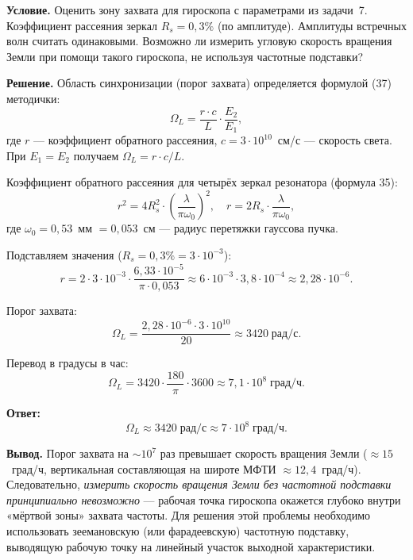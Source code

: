 \documentclass[12pt, a4paper]{article}
\begin{document}
\textbf{Условие.} Оценить зону захвата для гироскопа с параметрами из задачи~7. Коэффициент рассеяния зеркал $R_s = 0{,}3\%$ (по амплитуде). Амплитуды встречных волн считать одинаковыми. Возможно ли измерить угловую скорость вращения Земли при помощи такого гироскопа, не используя частотные подставки?

\textbf{Решение.} Область синхронизации (порог захвата) определяется формулой (37) методички:
\begin{equation}
    \Omega_L = \frac{r \cdot c}{L} \cdot \frac{E_2}{E_1},
\end{equation}
где $r$ --- коэффициент обратного рассеяния, $c = 3 \cdot 10^{10}$~см/с --- скорость света. При $E_1 = E_2$ получаем $\Omega_L = r \cdot c / L$.

Коэффициент обратного рассеяния для четырёх зеркал резонатора (формула 35):
\begin{equation}
    r^2 = 4 R_s^2 \cdot \left(\frac{\lambda}{\pi \omega_0}\right)^2, \quad r = 2 R_s \cdot \frac{\lambda}{\pi \omega_0},
\end{equation}
где $\omega_0 = 0{,}53$~мм $= 0{,}053$~см --- радиус перетяжки гауссова пучка.

Подставляем значения ($R_s = 0{,}3\% = 3 \cdot 10^{-3}$):
\begin{equation}
    r = 2 \cdot 3 \cdot 10^{-3} \cdot \frac{6{,}33 \cdot 10^{-5}}{\pi \cdot 0{,}053} \approx 6 \cdot 10^{-3} \cdot 3{,}8 \cdot 10^{-4} \approx 2{,}28 \cdot 10^{-6}.
\end{equation}

Порог захвата:
\begin{equation}
    \Omega_L = \frac{2{,}28 \cdot 10^{-6} \cdot 3 \cdot 10^{10}}{20} \approx 3420 \; \text{рад/с}.
\end{equation}

Перевод в градусы в час:
\begin{equation}
    \Omega_L = 3420 \cdot \frac{180}{\pi} \cdot 3600 \approx 7{,}1 \cdot 10^8 \; \text{град/ч}.
\end{equation}

\textbf{Ответ:}
\[
    \boxed{\Omega_L \approx 3420 \; \text{рад/с} \approx 7 \cdot 10^8 \; \text{град/ч}.}
\]

\textbf{Вывод.} Порог захвата на $\sim 10^7$ раз превышает скорость вращения Земли ($\approx 15$~град/ч, вертикальная составляющая на широте МФТИ $\approx 12{,}4$~град/ч). Следовательно, \textit{измерить скорость вращения Земли без частотной подставки принципиально невозможно} --- рабочая точка гироскопа окажется глубоко внутри «мёртвой зоны» захвата частоты. Для решения этой проблемы необходимо использовать зеемановскую (или фарадеевскую) частотную подставку, выводящую рабочую точку на линейный участок выходной характеристики.
\end{document}
